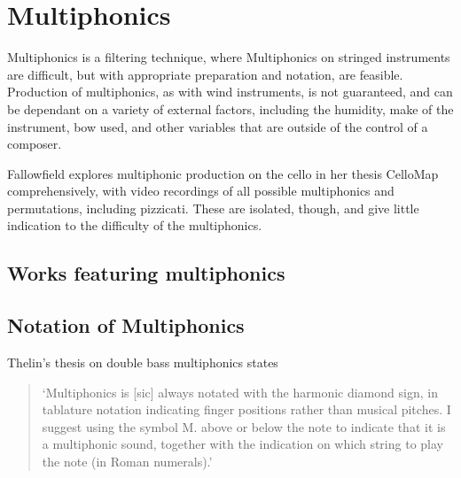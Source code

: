 \section{Multiphonics}
Multiphonics is a filtering technique, where 
Multiphonics on stringed instruments are difficult, but with appropriate preparation and notation, are feasible. Production of multiphonics, as with wind instruments, is not guaranteed, and can be dependant on a variety of external factors, including the humidity, make of the instrument, bow used, and other variables that are outside of the control of a composer.

Fallowfield explores multiphonic production on the cello in her thesis CelloMap comprehensively, with video recordings of all possible multiphonics and permutations, including pizzicati.\autocite{fallowfieldCelloMapHandbook2009} These are isolated, though, and give little indication to the difficulty of the multiphonics.

\subsection{Works featuring multiphonics}
\lipsum[2]

\subsection{Notation of Multiphonics}

Thelin's thesis on double bass multiphonics states
\begin{quotation}
    `Multiphonics is [sic] always notated with the harmonic diamond sign, in tablature notation
indicating finger positions rather than musical pitches. I suggest using the symbol M. above or
below the note to indicate that it is a multiphonic sound, together with the indication on which
string to play the note (in Roman numerals).'\autocite[6]{thelinMultiphonicsDoubleBass2011}
\end{quotation}

